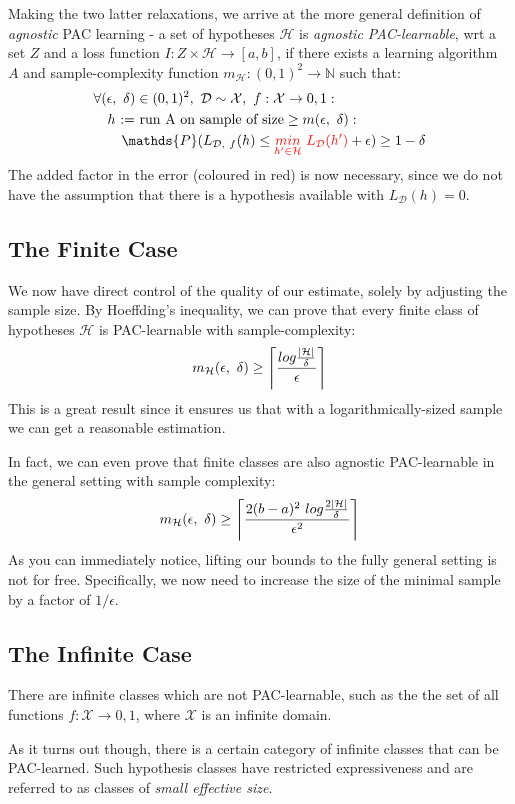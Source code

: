 \documentclass[11pt]{sigplanconf}
\DeclarePairedDelimiter{\ceil}{\lceil}{\rceil}
\newcommand\todo[1]{\textcolor{red}{#1}}
\renewcommand\it{\textit}
\renewcommand\H{\mathcal{H}}
\newcommand\D{\mathcal{D}}
\newcommand\X{\mathcal{X}}
\renewcommand\P{\mathds{P}}
\newcommand\N{\mathds{N}}
\begin{document}
Making the two latter relaxations, we arrive at the more general definition of \it{agnostic} PAC learning - a set of hypotheses $\H$ is \it{agnostic PAC-learnable}, wrt a set $Z$ and a loss function $I:Z\times\H\to[a, b]$, if there exists a learning algorithm $A$ and sample-complexity function $m_{\H}:(0,1)^2 \to \N$ such that:
\begin{align*}
&\forall (\epsilon,\ \delta)\in(0,1)^2,\ \D \sim \X,\ f:\X\to{0,1}: \\
&\quad h \ \text{:= run A on sample of size} \geq m(\epsilon,\ \delta): \\
&\quad \quad \P(L_{\D,\ f}(h) \leq \todo{\underset{h'\in\H}{min}\ L_{\D}(h')} + \epsilon) \geq 1 - \delta
\end{align*}
The added factor in the error (coloured in red) is now necessary, since we do not have the assumption that there is a hypothesis available with $L_{\D}(h) = 0$.

\subsection{The Finite Case}
We now have direct control of the quality of our estimate, solely by adjusting the sample size. By Hoeffding's inequality, we can prove that every finite class of hypotheses $\H$ is PAC-learnable with sample-complexity:
\[ m_{\H}(\epsilon,\ \delta) \geq \ceil[\Bigg]{\frac{log\frac{|\H|}{\delta}}{\epsilon}}
\]
This is a great result since it ensures us that with a logarithmically-sized sample we can get a reasonable estimation.

In fact, we can even prove that finite classes are also agnostic PAC-learnable in the general setting with sample complexity:
\[ m_{\H}(\epsilon,\ \delta) \geq \ceil[\Bigg]{\frac{2(b - a)^2\ log\frac{2|\H|}{\delta}}{\epsilon^2}}
\]
As you can immediately notice, lifting our bounds to the fully general setting is not for free. Specifically, we now need to increase the size of the minimal sample by a factor of $1/\epsilon$.

\subsection{The Infinite Case}
There are infinite classes which are not PAC-learnable, such as the the set of all functions $f: \X \to {0, 1}$, where $\X$ is an infinite domain.

As it turns out though, there is a certain category of infinite classes that can be PAC-learned. Such hypothesis classes have restricted expressiveness and are referred to as classes of \it{small effective size}.
\end{document}
